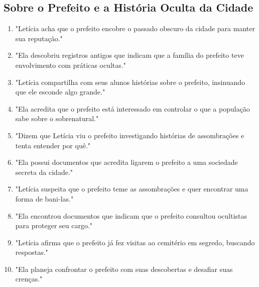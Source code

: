 \subsection*{Sobre o Prefeito e a História Oculta da Cidade}
\begin{enumerate}
    \item "Letícia acha que o prefeito encobre o passado obscuro da cidade para manter sua reputação."
    \item "Ela descobriu registros antigos que indicam que a família do prefeito teve envolvimento com práticas ocultas."
    \item "Letícia compartilha com seus alunos histórias sobre o prefeito, insinuando que ele esconde algo grande."
    \item "Ela acredita que o prefeito está interessado em controlar o que a população sabe sobre o sobrenatural."
    \item "Dizem que Letícia viu o prefeito investigando histórias de assombrações e tenta entender por quê."
    \item "Ela possui documentos que acredita ligarem o prefeito a uma sociedade secreta da cidade."
    \item "Letícia suspeita que o prefeito teme as assombrações e quer encontrar uma forma de bani-las."
    \item "Ela encontrou documentos que indicam que o prefeito consultou ocultistas para proteger seu cargo."
    \item "Letícia afirma que o prefeito já fez visitas ao cemitério em segredo, buscando respostas."
    \item "Ela planeja confrontar o prefeito com suas descobertas e desafiar suas crenças."
\end{enumerate}

